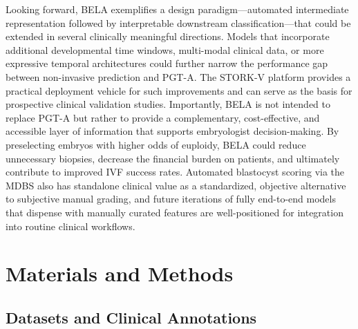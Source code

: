 \documentclass[11pt]{article}
\begin{document}
Looking forward, BELA exemplifies a design paradigm---automated intermediate representation followed by interpretable downstream classification---that could be extended in several clinically meaningful directions. Models that incorporate additional developmental time windows, multi-modal clinical data, or more expressive temporal architectures could further narrow the performance gap between non-invasive prediction and PGT-A. The STORK-V platform provides a practical deployment vehicle for such improvements and can serve as the basis for prospective clinical validation studies. Importantly, BELA is not intended to replace PGT-A but rather to provide a complementary, cost-effective, and accessible layer of information that supports embryologist decision-making. By preselecting embryos with higher odds of euploidy, BELA could reduce unnecessary biopsies, decrease the financial burden on patients, and ultimately contribute to improved IVF success rates. Automated blastocyst scoring via the MDBS also has standalone clinical value as a standardized, objective alternative to subjective manual grading, and future iterations of fully end-to-end models that dispense with manually curated features are well-positioned for integration into routine clinical workflows.


\section{Materials and Methods}

\subsection{Datasets and Clinical Annotations}
\end{document}
